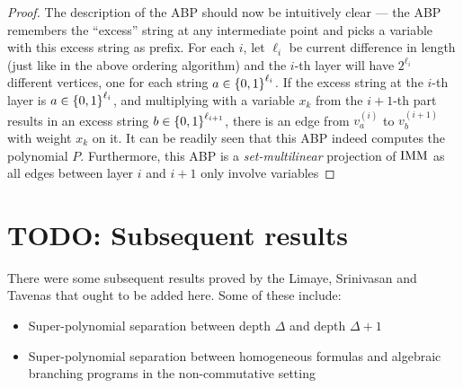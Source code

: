 \begin{proof}
The description of the ABP should now be intuitively clear --- the ABP remembers the ``excess'' string at any intermediate point and picks a variable with this excess string as prefix. For each $i$, let $\ell_i$ be current difference in length (just like in the above ordering algorithm) and the $i$-th layer will have $2^{\ell_i}$ different vertices, one for each string $a \in \left\{0,1\right\}^{\ell_i}$. If the excess string at the $i$-th layer is $a \in \left\{0,1\right\}^{\ell_i}$, and multiplying with a variable $x_{k}$ from the $i+1$-th part results in an excess string $b \in \left\{0,1\right\}^{\ell_{i+1}}$, there is an edge from $v_{a}^{(i)}$ to $v_{b}^{(i+1)}$ with weight $x_k$ on it. It can be readily seen that this ABP indeed computes the polynomial $P$. Furthermore, this ABP is a \emph{set-multilinear} projection of $\operatorname{\mathrm{IMM}}$ as all edges between layer $i$ and $i+1$ only involve variables   
\end{proof}

  

\section{TODO: Subsequent results}

There were some subsequent results proved by the Limaye, Srinivasan and Tavenas that ought to be added here. Some of these include:
\begin{itemize}\itemsep0pt
\item Super-polynomial separation between depth $\Delta$ and depth $\Delta+1$
\item Super-polynomial separation between homogeneous formulas and algebraic branching programs in the non-commutative setting
\end{itemize}





